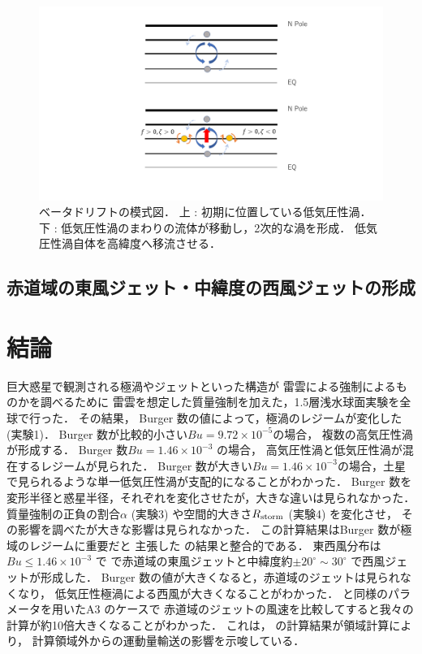 \documentclass[a4j,12pt,openbib,oneside]{jreport}
\begin{document}
\begin{figure}[ht]
  \begin{center}
    \includegraphics[clip,width=14cm]{./fig/consideration/betadrift_1.png}
    \caption{
      \footnotesize{ベータドリフトの模式図．
上 : 初期に位置している低気圧性渦．
下 : 低気圧性渦のまわりの流体が移動し，2次的な渦を形成．
低気圧性渦自体を高緯度へ移流させる．
      }
    }
    \label{fig:betadrift}
  \end{center}
\end{figure}
\clearpage
%
\newpage
\section{赤道域の東風ジェット・中緯度の西風ジェットの形成}
\label{sec:considvellon}
%
%
\def\chap5{結論}
\chapter{\chap5}
\label{chap:5}
\markright{5 \chap5}
巨大惑星で観測される極渦やジェットといった構造が
雷雲による強制によるものかを調べるために
雷雲を想定した質量強制を加えた，1.5層浅水球面実験を全球で行った．
%
その結果，
Burger 数の値によって，極渦のレジームが変化した(実験1)．
%
Burger 数が比較的小さい$Bu = 9.72 \times 10^{-5}$の場合， 複数の高気圧性渦が形成する．
Burger 数$Bu = 1.46 \times 10^{-3}$ の場合， 高気圧性渦と低気圧性渦が混在するレジームが見られた．
Burger 数が大きい$Bu = 1.46 \times 10^{-3}$の場合，土星で見られるような単一低気圧性渦が支配的になることがわかった．
Burger 数を変形半径と惑星半径，それぞれを変化させたが，大きな違いは見られなかった．
質量強制の正負の割合$\alpha $ (実験3) や空間的大きさ$R_{\rm{storm}}$ (実験4) を変化させ，
その影響を調べたが大きな影響は見られなかった．
この計算結果はBurger 数が極域のレジームに重要だと
主張した \cite{Brueshaber2019} の結果と整合的である．
%
東西風分布は$Bu \leq 1.46 \times 10^{-3}$ で
で赤道域の東風ジェットと中緯度約$\pm 20^\circ \sim 30^\circ$ で西風ジェットが形成した．
Burger 数の値が大きくなると，赤道域のジェットは見られなくなり，
低気圧性極渦による西風が大きくなることがわかった．
%
\cite{Showman2007} と同様のパラメータを用いたA3 のケースで
赤道域のジェットの風速を比較してすると我々の計算が約10倍大きくなることがわかった．
これは，\cite{Showman2007} の計算結果が領域計算により，
計算領域外からの運動量輸送の影響を示唆している．
\end{document}
